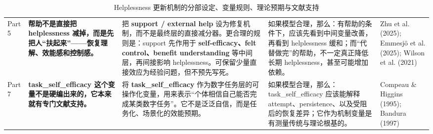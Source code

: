 \documentclass[11pt]{article}
\begin{document}
\begin{table}[htbp]
\begin{tabularx}{\textwidth}{P{1.15cm} Y Y Y Y}
Part 5 &
\textbf{帮助不是直接把 helplessness 减掉，而是先把人“扶起来”——恢复理解、效能感和控制感。} &
把 \textbf{support / external help} 设为修复机制，而不是最终层的直接减分器。更合理的规则是：support 先作用于 \textbf{self-efficacy、felt control、benefit understanding} 等中间层，再间接影响 helplessness。可保留少量直接效应为经验问题，但不预先写死。 &
如果模型合理，那么：有帮助的条件下，应该先看到中间变量改善，再看到 helplessness 缓和；而“代替做完”的帮助，不一定真正降低长期 helplessness，甚至可能增加依赖。 &
Zhu et al. (2025); Emmesjö et al. (2025); Wilson et al. (2021) \\

Part 7 &
\textbf{task\_self\_efficacy 这个变量不是硬编出来的，它本来就有专门文献支持。} &
将 \textbf{task\_self\_efficacy} 作为数字任务层的可操作化变量，用来表示“个体相信自己能否完成某类数字任务”。它不是泛泛自信，而是任务化、场景化的效能预期。 &
如果模型合理，那么：task\_self\_efficacy 应该能解释 attempt、persistence、以及受阻后的恢复差异；它作为机制变量是有测量传统与理论根基的。 &
Compeau \& Higgins (1995); Bandura (1997) \\

\bottomrule
\end{tabularx}
\caption{Helplessness 更新机制的分部设定、变量规则、理论预期与文献支持}
\label{tab:helplessness_update_mechanism}
\end{table}
\end{document}
